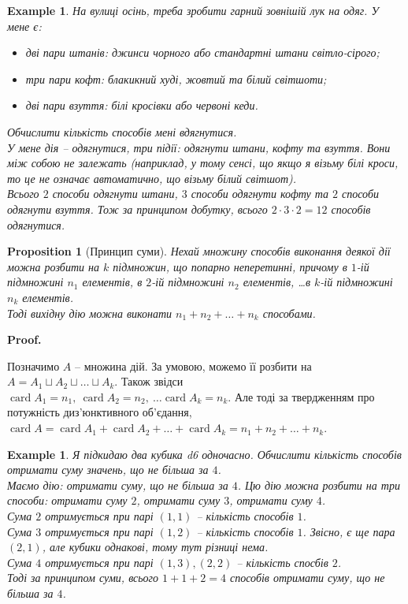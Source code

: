 \documentclass[a4paper, 14pt]{extarticle}
\makeatletter
\theoremstyle{theoremdd}
\theoremstyle{theoremdd}
\theoremstyle{theoremdd}
\theoremstyle{theoremdd}
\theoremstyle{theoremdd}
\newtheorem{example}[theorem]{Example}
\theoremstyle{theoremdd}
\theoremstyle{theoremdd}
\theoremstyle{theoremdd}
\theoremstyle{theoremdd}
\newtheorem{proposition}[theorem]{Proposition}
\theoremstyle{theoremdd}
\theoremstyle{theoremdd}
\theoremstyle{theoremdd}
\theoremstyle{theoremdd}
\theoremstyle{theoremdd}
\theoremstyle{theoremdd}
\renewenvironment{proof}[1][Proof.\\]{\par
\pushQED{\hfill \qed}%
\normalfont \topsep6\p@\@plus6\p@\relax
\trivlist
\item\relax
{\bfseries
#1\@addpunct{.}}\hspace\labelsep\ignorespaces
}{%
\popQED\endtrivlist\@endpefalse
}
\DeclareMathOperator{\card}{card}
\makeatother
\begin{document}
\begin{example}
На вулиці осінь, треба зробити гарний зовнішій лук на одяг. У мене є:
\begin{itemize}[nosep, wide=0pt, label={-}]
\item дві пари штанів: джинси чорного або стандартні штани світло-сірого;
\item три пари кофт: блакикний худі, жовтий та білий світшоти;
\item дві пари взуття: білі кросівки або червоні кеди.
\end{itemize}
Обчислити кількість способів мені вдягнутися.
\bigskip \\
У мене дія -- одягнутися, три підії: одягнути штани, кофту та взуття. Вони між собою не залежать (наприклад, у тому сенсі, що якщо я візьму білі кроси, то це не означає автоматично, що візьму білий світшот).\\
Всього $2$ способи одягнути штани, $3$ способи одягнути кофту та $2$ способи одягнути взуття. Тож за принципом добутку, всього $2 \cdot 3 \cdot 2 = 12$ способів одягнутися.
\end{example}

\begin{proposition}[Принцип суми]
Нехай множину способів виконання деякої дії можна розбити на $k$ підмножин, що попарно неперетинні, причому в $1$-ій підмножині $n_1$ елементів, в $2$-ій підмножині $n_2$ елементів, \dots в $k$-ій підмножині $n_k$ елементів.\\
Тоді вихідну дію можна виконати $n_1 + n_2 + \dots + n_k$ способами.
\end{proposition}

\begin{proof}
Позначимо $A$ -- множина дій. За умовою, можемо її розбити на $A = A_1 \sqcup A_2 \sqcup \dots \sqcup A_k$. Також звідси $\card A_1 = n_1,\ \card A_2 = n_2,\ \dots \card A_k = n_k$. Але тоді за твердженням про потужність диз'юнктивного об'єдання,\\
$\card A = \card A_1 + \card A_2 + \dots + \card A_k = n_1 + n_2 + \dots + n_k$.
\end{proof}

\begin{example}
Я підкидаю два кубика d6 одночасно. Обчислити кількість способів отримати суму значень, що не більша за $4$.\\
Маємо дію: отримати суму, що не більша за $4$. Цю дію можна розбити на три способи: отримати суму $2$, отримати суму $3$, отримати суму $4$.\\
Сума $2$ отримується при парі $(1,1)$ -- кількість способів $1$.\\
Сума $3$ отримується при парі $(1,2)$ -- кількість способів $1$. Звісно, є ще пара $(2,1)$, але кубики однакові, тому тут різниці нема.\\
Сума $4$ отримується при парі $(1,3),(2,2)$ -- кількість спосбів $2$.\\
Тоді за принципом суми, всього $1 + 1 + 2 = 4$ способів отримати суму, що не більша за $4$.
\end{example}
\end{document}
